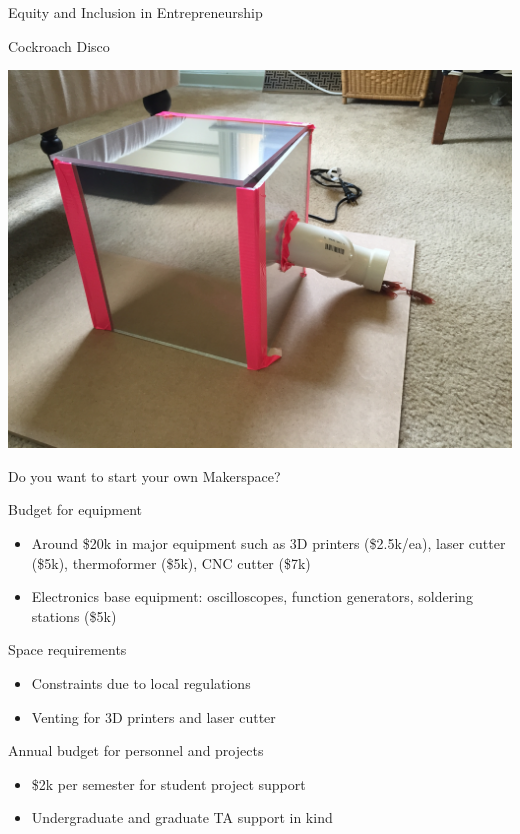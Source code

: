 \documentclass[xcolor=table,compress,professionalfonts,pdfpagelabels]{beamer}
\begin{document}
\begin{frame}{Equity and Inclusion in Entrepreneurship}
 \begin{block}{Cockroach Disco}
 \begin{center}
  \includegraphics[height=0.75\textheight]{IMG_5941}
 \end{center}
 \end{block}
\end{frame}

\begin{frame}{Do you want to start your own Makerspace?}
 \begin{block}{Budget for equipment}
  \begin{itemize}
   \item Around \$20k in major equipment such as 3D printers (\$2.5k/ea), laser cutter (\$5k), thermoformer (\$5k), CNC cutter (\$7k)
   \item Electronics base equipment: oscilloscopes, function generators, soldering stations (\$5k)
  \end{itemize}
 \end{block}
 \begin{block}{Space requirements}
  \begin{itemize}
   \item Constraints due to local regulations
   \item Venting for 3D printers and laser cutter
  \end{itemize}
 \end{block}
 \begin{block}{Annual budget for personnel and projects}
  \begin{itemize}
   \item \$2k per semester for student project support
   \item Undergraduate and graduate TA support in kind
  \end{itemize}
 \end{block}
\end{frame}
\end{document}
